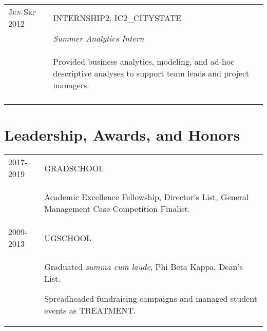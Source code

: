 \documentclass[a4paper,10pt]{article}
\begin{document}
\begin{supertabular}{l p{0.55cm} p{13.9cm}}
	\textsc{Jun-Sep 2012}		&& \textsc{INTERNSHIP2}, IC2_CITYSTATE \\
	\textsc{}							&& \small	\emph{Summer Analytics Intern} \\
												&& \begin{enumerate*}[label =$\diamond$, itemjoin={\newline}]
														\item \footnotesize Provided business analytics, modeling, and ad-hoc descriptive analyses to support team leads and project managers.
														\end{enumerate*} \\
	 \\


\end{supertabular}





\section{Leadership, Awards, and Honors}
\begin{supertabular}{p{3.4cm} p{13.9cm}}

	\textsc{2017-2019} 				& \textsc{GRADSCHOOL} \\
														& \begin{enumerate*}[label =$\diamond$, itemjoin={\newline}]
																\item \footnotesize Academic Excellence Fellowship, Director's List, General Management Case Competition Finalist.
																\end{enumerate*} \vspace{2mm} \\

	\textsc{2009-2013} 				& \textsc{UGSCHOOL} \\
														& \begin{enumerate*}[label =$\diamond$, itemjoin={\newline}]
																\item \footnotesize  Graduated \emph{summa cum laude}, Phi Beta Kappa, Dean's List.
																\item \footnotesize  Spreadheaded fundraising campaigns and managed student events as TREATMENT.
																\end{enumerate*} \vspace{2mm} \\



\end{supertabular}
\end{document}
